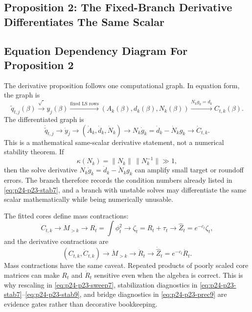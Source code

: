 \documentclass[11pt]{article}
\numberwithin{equation}{section}
\begin{document}
\subsection{Proposition 2: The Fixed-Branch Derivative Differentiates The Same Scalar}

\subsection*{Equation Dependency Diagram For Proposition 2}

The derivative proposition follows one computational graph.  In equation form,
the graph is
\begin{equation}
    \widetilde q_{t,j}(\beta)
    \xrightarrow{\sqrt{\cdot}}
    y_j(\beta)
    \xrightarrow{\text{fixed LS rows}}
    (A_k(\beta),d_k(\beta),N_k(\beta))
    \xrightarrow{N_kg_k=d_k}
    C_{t,k}(\beta).
    \label{eq:p24-p23-gdag1}
\end{equation}
The differentiated graph is
\begin{equation}
    \dot{\widetilde q}_{t,j}
    \to
    \dot y_j
    \to
    (\dot A_k,\dot d_k,\dot N_k)
    \to
    N_k\dot g_k=\dot d_k-\dot N_k g_k
    \to
    \dot C_{t,k}.
    \label{eq:p24-p23-gdag2}
\end{equation}
This is a mathematical same-scalar derivative statement, not a numerical
stability theorem.  If
\begin{equation}
    \kappa(N_k)
    =
    \|N_k\|\,\|N_k^{-1}\|
    \gg 1,
    \label{eq:p24-p23-gdag2a}
\end{equation}
then the solve derivative
\(N_k\dot g_k=\dot d_k-\dot N_kg_k\) can amplify small target or roundoff
errors.  The branch therefore records the condition numbers already listed in
\eqref{eq:p24-p23-stab7}, and a branch with unstable solves may differentiate the same
scalar mathematically while being numerically unusable.

The fitted cores define mass contractions:
\begin{equation}
    C_{t,k}
    \to
    M_{>k}
    \to
    R_t=\int\phi_t^2
    \to
    \zeta_t=R_t+\tau_t
    \to
    \widehat Z_t=e^{-c_t}\zeta_t,
    \label{eq:p24-p23-gdag3}
\end{equation}
and the derivative contractions are
\begin{equation}
    (C_{t,k},\dot C_{t,k})
    \to
    \dot M_{>k}
    \to
    \dot R_t
    \to
    \dot{\widehat Z}_t=e^{-c_t}\dot R_t.
    \label{eq:p24-p23-gdag4}
\end{equation}
Mass contractions have the same caveat.  Repeated products of poorly scaled
core matrices can make \(R_t\) and \(\dot R_t\) sensitive even when the algebra
is correct.  This is why rescaling in \eqref{eq:p24-p23-sweep7}, stabilization diagnostics
in \eqref{eq:p24-p23-stab7}--\eqref{eq:p24-p23-stab9}, and bridge diagnostics in \eqref{eq:p24-p23-prec9} are
evidence gates rather than decorative bookkeeping.
\end{document}
